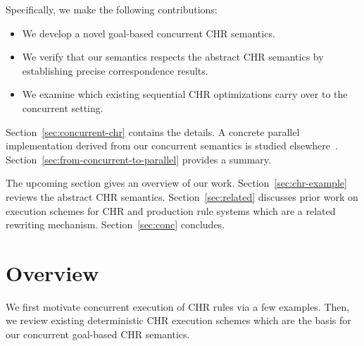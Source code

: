 \documentclass{tlp}
\begin{document}
Specifically, we make the following contributions:
\begin{itemize}
 \item We develop a novel goal-based concurrent CHR semantics.
 \item We verify that our semantics respects
        the abstract CHR semantics by establishing precise
        correspondence results.
 \item We examine which existing sequential CHR optimizations carry over
       to the concurrent setting.
\end{itemize}
Section~\ref{sec:concurrent-chr} contains the details.
A concrete parallel implementation derived from our concurrent semantics is
studied elsewhere~\cite{parallel-chr}. 
Section~\ref{sec:from-concurrent-to-parallel} provides a summary.


The upcoming section gives an overview of our work.
Section~\ref{sec:chr-example} reviews the abstract CHR semantics.
Section~\ref{sec:related} discusses prior work on execution schemes 
for CHR and production rule systems which are a related rewriting mechanism.
Section~\ref{sec:conc} concludes.


\section{Overview}

We first motivate concurrent execution of CHR rules via a few examples.
Then, we review existing deterministic CHR execution schemes
which are the basis for our concurrent goal-based CHR semantics.


\end{document}
